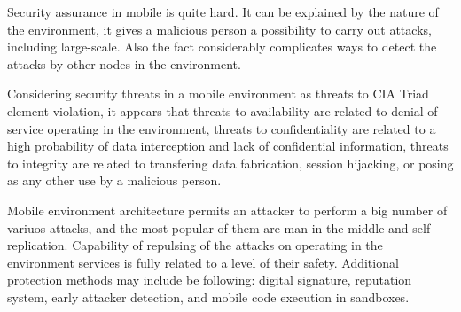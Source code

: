 

%
Security assurance in mobile  is quite hard. 
%
It can be explained by the nature of the environment, it gives a malicious person a possibility to carry out attacks, including large-scale. 
%
Also the fact considerably complicates ways to detect the attacks by other nodes in the environment. 

%
Considering security threats in a mobile  environment as threats to CIA Triad element violation, it appears that threats to availability are related to denial of service operating in the environment, threats to confidentiality are related to a high probability of data interception and lack of confidential information, threats to integrity are related to transfering data fabrication, session hijacking, or posing as any other use by a malicious person. 

%
Mobile  environment architecture permits an attacker to perform a big number of variuos attacks, and the most popular of them are man-in-the-middle and self-replication. 
%
Capability of repulsing of the attacks on operating in the environment services is fully related to a level of their safety. 
%
Additional protection methods may include be following: digital signature, reputation system, early attacker detection, and mobile code execution in sandboxes. 